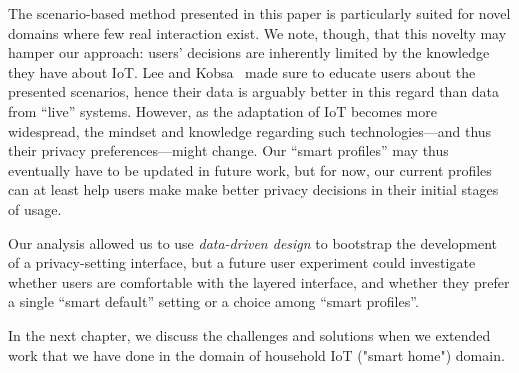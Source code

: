 The scenario-based method presented in this paper is particularly suited for novel domains where few real interaction exist. We note, though, that this novelty may hamper our approach: users' decisions are inherently limited by the knowledge they have about IoT. Lee and Kobsa~\cite{lee2016understanding} made sure to educate users about the presented scenarios, hence their data is arguably better in this regard than data from ``live'' systems. However, as the adaptation of IoT becomes more widespread, the mindset and knowledge regarding such technologies---and thus their privacy preferences---might change. Our ``smart profiles'' may thus eventually have to be updated in future work, but for now, our current profiles can at least help users make make better privacy decisions in their initial stages of usage.

Our analysis allowed us to use \emph{data-driven design} to bootstrap the development of a privacy-setting interface, but a future user experiment could investigate whether users are comfortable with the layered interface, and whether they prefer a single ``smart default'' setting or a choice among ``smart profiles''.

In the next chapter, we discuss the challenges and solutions when we extended work that we have done in the domain of household IoT ("smart home") domain.
